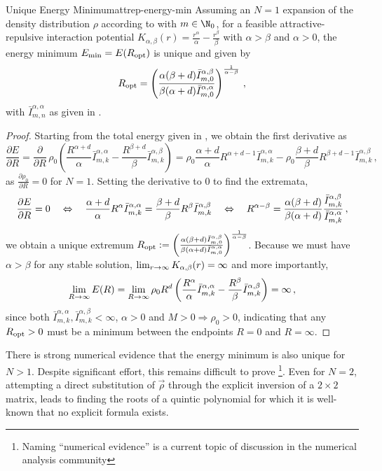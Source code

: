 \begin{lemma}{Unique Energy Minimum}{attrep-energy-min}
  Assuming an $N=1$ expansion of the density distribution $\rho$ according to  with $m \in \N_0$, for a feasible attractive-repulsive interaction potential $K_{\alpha, \beta}(r) = \frac{r^\alpha}{\alpha} - \frac{r^\beta}{\beta}$ with $\alpha > \beta$ and $\alpha > 0$, the energy minimum $E_{\rm min} = E(R_{\rm opt})$ is unique and given by
  $$R_{\rm opt} = \left(\frac{\alpha(\beta+d) \bar{I}_{m,0}^{\alpha,\beta}}{\beta(\alpha+d) \bar{I}_{m,0}^{\alpha,\alpha}}\right)^\frac{1}{\alpha-\beta}\,,$$
  with $\bar{I}_{m,n}^{\alpha,\alpha}$ as given in .
\end{lemma}
\begin{proof}
  Starting from the total energy given in , we obtain the first derivative as
  $$\frac{\partial E}{\partial R} = \frac{\partial}{\partial R}\, \rho_0 \left(\frac{R^{\alpha+d}}{\alpha} \bar{I}_{m,k}^{\alpha,\alpha} - \frac{R^{\beta+d}}{\beta} \bar{I}_{m,k}^{\alpha,\beta}\right) = \rho_0 \frac{\alpha+d}{\alpha} R^{\alpha+d-1} \bar{I}_{m,k}^{\alpha,\alpha} - \rho_0 \frac{\beta+d}{\beta} R^{\beta+d-1} \bar{I}_{m,k}^{\alpha,\beta}\,,$$
  as $\frac{\partial \rho_0}{\partial R} = 0$ for $N = 1$.
  Setting the derivative to $0$ to find the extremata,
  $$\frac{\partial E}{\partial R} = 0 \quad\Leftrightarrow\quad \frac{\alpha+d}{\alpha} R^{\alpha} \bar{I}_{m,k}^{\alpha,\alpha} = \frac{\beta+d}{\beta} R^{\beta} \bar{I}_{m,k}^{\alpha,\beta} \quad\Leftrightarrow\quad R^{\alpha-\beta} = \frac{\alpha (\beta+d)}{\beta(\alpha+d)} \frac{\bar{I}_{m,k}^{\alpha,\beta}}{\bar{I}_{m,k}^{\alpha,\alpha}}\,,$$
  we obtain a unique extremum $R_{\rm opt} := \left(\frac{\alpha(\beta+d) \bar{I}_{m,0}^{\alpha,\beta}}{\beta(\alpha+d) \bar{I}_{m,0}^{\alpha,\alpha}}\right)^\frac{1}{\alpha-\beta}$.
  Because we must have $\alpha > \beta$ for any stable solution, $\lim_{r \rightarrow \infty} K_{\alpha,\beta}(r) = \infty$ and more importantly,
  $$\lim_{R \rightarrow \infty} E(R) = \lim_{R \rightarrow \infty} \rho_0 R^d \left(\frac{R^{\alpha}}{\alpha} \bar{I}_{m,k}^{\alpha,\alpha} - \frac{R^{\beta}}{\beta} \bar{I}_{m,k}^{\alpha,\beta}\right) = \infty\,,$$
  since both $\bar{I}_{m,k}^{\alpha,\alpha}, \bar{I}_{m,k}^{\alpha,\beta} < \infty$, $\alpha > 0$ and $M > 0 \Rightarrow \rho_0 > 0$, indicating that any $R_{\rm opt} > 0$ must be a minimum between the endpoints $R = 0$ and $R = \infty$.
\end{proof}

There is strong numerical evidence that the energy minimum is also unique for $N > 1$.
Despite significant effort, this remains difficult to prove \footnote{Naming ``numerical evidence'' is a current topic of discussion in the numerical analysis community}.
Even for $N = 2$, attempting a direct substitution of $\vec{\rho}$ through the explicit inversion of a $2 \times 2$ matrix, leads to finding the roots of a quintic polynomial for which it is well-known that no explicit formula exists.

